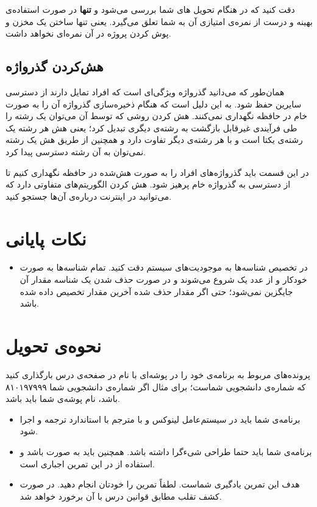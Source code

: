 \documentclass{utap}
\begin{document}
        دقت کنید که در هنگام تحویل های شما بررسی می‌شود و \textbf{تنها} در صورت استفاده‌ی بهینه و درست از  نمرەی امتیازی آن به شما تعلق می‌گیرد. یعنی تنها ساختن یک مخزن و پوش کردن پروژه در آن نمرەای نخواهد داشت.
		
        \subsection{هش‌کردن گذرواژه}
		همان‌طور که می‌دانید گذرواژه ویژگی‌ای است که افراد تمایل دارند از دسترسی سایرین حفظ شود. به این دلیل است که هنگام ذخیره‌سازی گذرواژه آن را به صورت خام در حافظه نگهداری نمی‌کنند. هش کردن روشی که توسط آن می‌توان یک رشته را طی فرآیندی غیرقابل بازگشت به رشته‌ی دیگری تبدیل کرد؛ یعنی هش هر رشته یک رشته‌ی یکتا است و با هر رشته‌ی دیگر تفاوت دارد و همچنین از طریق هش یک رشته نمی‌توان به آن رشته دسترسی پیدا کرد.
		
		در این قسمت باید گذرواژه‌های افراد را به صورت هش‌شده در حافظه نگهداری کنیم تا از دسترسی به گذرواژه خام پرهیز شود. هش کردن الگوریتم‌های متفاوتی دارد که می‌توانید در اینترنت درباره‌ی آن‌ها جستجو کنید.

	\section{نکات پایانی}
		\begin{itemize}
			\item  در تخصیص شناسه‌ها به موجودیت‌های سیستم دقت کنید. تمام شناسه‌ها به صورت خودکار و از عدد یک شروع می‌شوند و در صورت حذف شدن یک شناسه مقدار آن جایگزین نمی‌شود؛ حتی اگر مقدار حذف شده آخرین مقدار تخصیص داده شده باشد.
		
		\end{itemize}

	\section{نحوه‌ی تحویل}
		پرونده‌‌های مربوط به برنامه‌ی خود را در پوشه‌ای با نام  در صفحه‌ی  درس بارگذاری کنید که  شماره‌ی دانشجویی شماست؛ برای مثال اگر شماره‌ی دانشجویی شما ۸۱۰۱۹۷۹۹۹ باشد، نام پوشه‌ی شما باید  باشد.
		\begin{itemize}
			\item
						برنامه‌ی شما باید در سیستم‌عامل لینوکس و با مترجم  با استاندارد  ترجمه و اجرا شود.
					\item
						برنامه‌ی شما باید حتما طراحی شیءگرا داشته باشد. همچنین باید به صورت  باشد و استفاده از  در این تمرین اجباری است.
					\item
						هدف این تمرین یادگیری شماست. لطفاً تمرین را خودتان انجام دهید. در صورت کشف تقلب مطابق قوانین درس با آن برخورد خواهد شد.
		\end{itemize}
\end{document}
